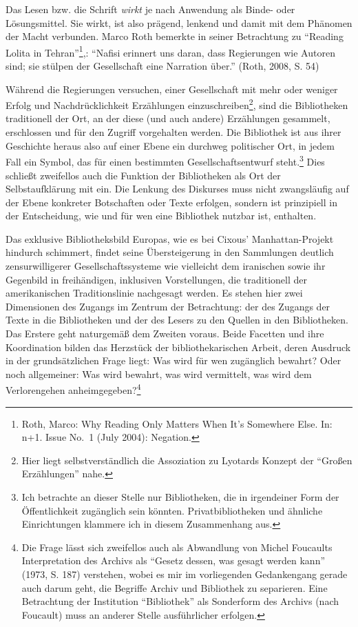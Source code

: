 \documentclass[output=paper]{langscibook}
\begin{document}
Das Lesen bzw. die Schrift \emph{wirkt} je nach Anwendung als Binde-
oder Lösungsmittel. Sie wirkt, ist also prägend, lenkend und damit mit
dem Phänomen der Macht verbunden. Marco Roth bemerkte in seiner
Betrachtung zu \enquote{Reading Lolita in Tehran}\footnote{Roth, Marco:
  Why Reading Only Matters When It's Somewhere Else. In: n+1. Issue
  No.~1 (July 2004): Negation.},: \enquote{Nafisi erinnert uns daran,
dass Regierungen wie Autoren sind; sie stülpen der Gesellschaft eine
Narration über.} (Roth, 2008, S. 54)

Während die Regierungen versuchen, einer Gesellschaft mit mehr oder
weniger Erfolg und Nachdrücklichkeit Erzählungen
einzuschreiben\footnote{Hier liegt selbstverständlich die Assoziation zu
  Lyotards Konzept der \enquote{Großen Erzählungen} nahe.}, sind die
Bibliotheken traditionell der Ort, an der diese (und auch andere)
Erzählungen gesammelt, erschlossen und für den Zugriff vorgehalten
werden. Die Bibliothek ist aus ihrer Geschichte heraus also auf einer
Ebene ein durchweg politischer Ort, in jedem Fall ein Symbol, das für
einen bestimmten Gesellschaftsentwurf steht.\footnote{Ich betrachte an
  dieser Stelle nur Bibliotheken, die in irgendeiner Form der
  Öffentlichkeit zugänglich sein könnten. Privatbibliotheken und
  ähnliche Einrichtungen klammere ich in diesem Zusammenhang aus.} Dies
schließt zweifellos auch die Funktion der Bibliotheken als Ort der
Selbstaufklärung mit ein. Die Lenkung des Diskurses muss nicht
zwangsläufig auf der Ebene konkreter Botschaften oder Texte erfolgen,
sondern ist prinzipiell in der Entscheidung, wie und für wen eine
Bibliothek nutzbar ist, enthalten.

Das exklusive Bibliotheksbild Europas, wie es bei Cixous'
Manhattan-Projekt hindurch schimmert, findet seine Übersteigerung in den
Sammlungen deutlich zensurwilligerer Gesellschaftssysteme wie vielleicht
dem iranischen sowie ihr Gegenbild in freihändigen, inklusiven
Vorstellungen, die traditionell der amerikanischen Traditionslinie
nachgesagt werden. Es stehen hier zwei Dimensionen des Zugangs im
Zentrum der Betrachtung: der des Zugangs der Texte in die Bibliotheken
und der des Lesers zu den Quellen in den Bibliotheken. Das Erstere geht
naturgemäß dem Zweiten voraus. Beide Facetten und ihre Koordination
bilden das Herzstück der bibliothekarischen Arbeit, deren Ausdruck in
der grundsätzlichen Frage liegt: Was wird für wen zugänglich bewahrt?
Oder noch allgemeiner: Was wird bewahrt, was wird vermittelt, was wird
dem Verlorengehen anheimgegeben?\footnote{Die Frage lässt sich
  zweifellos auch als Abwandlung von Michel Foucaults Interpretation des
  Archivs als \enquote{Gesetz dessen, was gesagt werden kann} (1973, S.
  187) verstehen, wobei es mir im vorliegenden Gedankengang gerade auch
  darum geht, die Begriffe Archiv und Bibliothek zu separieren. Eine
  Betrachtung der Institution \enquote{Bibliothek} als Sonderform des
  Archivs (nach Foucault) muss an anderer Stelle ausführlicher erfolgen.}
\end{document}
